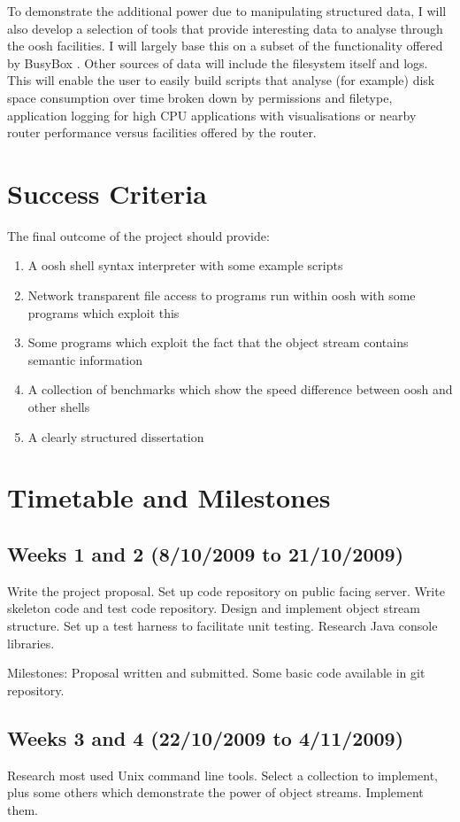 \documentclass[12pt]{article}
\begin{document}
To demonstrate the additional power due to manipulating structured
data, I will also develop a selection of tools that provide
interesting data to analyse through the oosh facilities. I will
largely base this on a subset of the functionality offered by BusyBox
\cite{busybox}. Other sources of data will include the filesystem
itself and logs. This will enable the user to easily build scripts
that analyse (for example) disk space consumption over time broken
down by permissions and filetype, application logging for high CPU
applications with visualisations or nearby router performance versus
facilities offered by the router.

\section*{Success Criteria}
The final outcome of the project should provide:

\begin{enumerate}
\item A oosh shell syntax interpreter with some example scripts
\item Network transparent file access to programs run within oosh with
  some programs which exploit this
\item Some programs which exploit the fact that the object stream
  contains semantic information
\item A collection of benchmarks which show the speed difference
  between oosh and other shells
\item A clearly structured dissertation
\end{enumerate}

\section*{Timetable and Milestones}

\subsection*{Weeks 1 and 2 (8/10/2009 to 21/10/2009)}
Write the project proposal. Set up code repository on public facing
server. Write skeleton code and test code repository. Design and
implement object stream structure. Set up a test harness to facilitate
unit testing. Research Java console libraries.

Milestones: Proposal written and submitted. Some basic code available
in git repository.

\subsection*{Weeks 3 and 4 (22/10/2009 to 4/11/2009)}
Research most used Unix command line tools. Select a collection to
implement, plus some others which demonstrate the power of object
streams. Implement them.
\end{document}
